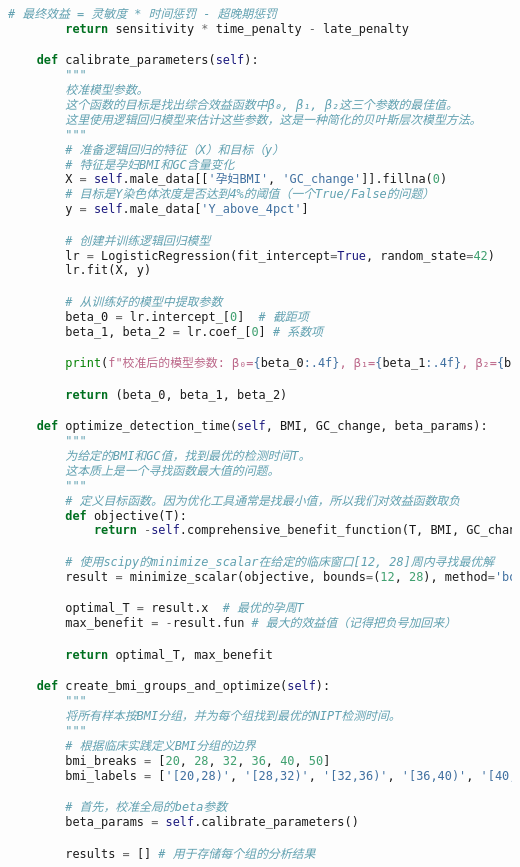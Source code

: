 \documentclass[UTF8, a4paper, 11pt]{ctexart}
\begin{document}
\begin{lstlisting}[language=Python, caption={问题二的解决方案脚本。}]
        # 最终效益 = 灵敏度 * 时间惩罚 - 超晚期惩罚
        return sensitivity * time_penalty - late_penalty

    def calibrate_parameters(self):
        """
        校准模型参数。
        这个函数的目标是找出综合效益函数中β₀, β₁, β₂这三个参数的最佳值。
        这里使用逻辑回归模型来估计这些参数，这是一种简化的贝叶斯层次模型方法。
        """
        # 准备逻辑回归的特征（X）和目标（y）
        # 特征是孕妇BMI和GC含量变化
        X = self.male_data[['孕妇BMI', 'GC_change']].fillna(0)
        # 目标是Y染色体浓度是否达到4%的阈值（一个True/False的问题）
        y = self.male_data['Y_above_4pct']

        # 创建并训练逻辑回归模型
        lr = LogisticRegression(fit_intercept=True, random_state=42)
        lr.fit(X, y)

        # 从训练好的模型中提取参数
        beta_0 = lr.intercept_[0]  # 截距项
        beta_1, beta_2 = lr.coef_[0] # 系数项

        print(f"校准后的模型参数: β₀={beta_0:.4f}, β₁={beta_1:.4f}, β₂={beta_2:.4f}")

        return (beta_0, beta_1, beta_2)

    def optimize_detection_time(self, BMI, GC_change, beta_params):
        """
        为给定的BMI和GC值，找到最优的检测时间T。
        这本质上是一个寻找函数最大值的问题。
        """
        # 定义目标函数。因为优化工具通常是找最小值，所以我们对效益函数取负
        def objective(T):
            return -self.comprehensive_benefit_function(T, BMI, GC_change, beta_params)

        # 使用scipy的minimize_scalar在给定的临床窗口[12, 28]周内寻找最优解
        result = minimize_scalar(objective, bounds=(12, 28), method='bounded')

        optimal_T = result.x  # 最优的孕周T
        max_benefit = -result.fun # 最大的效益值（记得把负号加回来）

        return optimal_T, max_benefit

    def create_bmi_groups_and_optimize(self):
        """
        将所有样本按BMI分组，并为每个组找到最优的NIPT检测时间。
        """
        # 根据临床实践定义BMI分组的边界
        bmi_breaks = [20, 28, 32, 36, 40, 50]
        bmi_labels = ['[20,28)', '[28,32)', '[32,36)', '[36,40)', '[40,50)']

        # 首先，校准全局的beta参数
        beta_params = self.calibrate_parameters()

        results = [] # 用于存储每个组的分析结果


\end{lstlisting}
\end{document}
